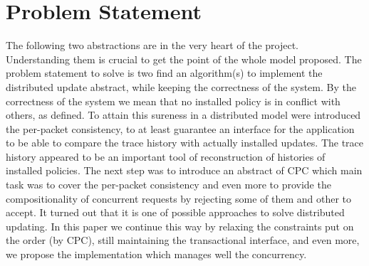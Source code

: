 \documentclass{article}
\theoremstyle{remark}
\begin{document}
\section{Problem Statement}
The following two abstractions are in the very heart of the project. Understanding them is crucial to get the point of the whole model proposed.
The problem statement to solve is two find an algorithm(s) to implement the distributed update abstract, while keeping the correctness of the system. By the correctness of the system we mean that no installed policy is in conflict with others, as defined. To attain this sureness in a distributed model were introduced the per-packet consistency, to at least guarantee an interface for the application to be able to compare the trace history with actually installed updates. The trace history appeared to be an important tool of reconstruction of histories of installed policies. The next step was to introduce an abstract of CPC which main task was to cover the per-packet consistency and even more to provide the compositionality of concurrent requests by rejecting some of them and other to accept. It turned out that it is one of possible approaches to solve distributed updating. In this paper we continue this way by relaxing the constraints put on the order (by CPC), still maintaining the transactional interface, and even more, we propose the implementation which manages well the concurrency.
\end{document}
